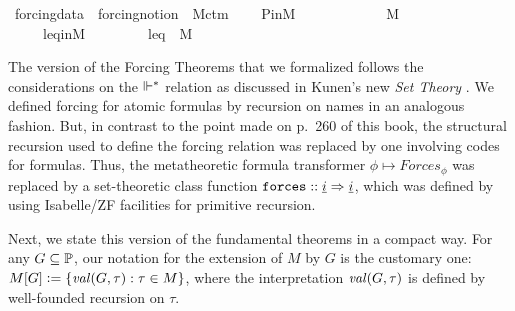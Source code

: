 \begin{isabelle}
\isamarkupfalse%
\ forcing{\isacharunderscore}{\kern0pt}data{}\ {\isacharequal}{\kern0pt}\ forcing{\isacharunderscore}{\kern0pt}notion\ {\isacharplus}{\kern0pt}\ M{\isacharunderscore}{\kern0pt}ctm{}\ {\isacharplus}{\kern0pt}\isanewline
\ \ \ P{\isacharunderscore}{\kern0pt}in{\isacharunderscore}{\kern0pt}M{\isacharcolon}{\kern0pt}\ \ \ \ \ \ \ \ \ \ \ {\isachardoublequoteopen}{\isasymbbbP}\ {\isasymin}\ M{\isachardoublequoteclose}\isanewline
\ \ \ \ \ leq{\isacharunderscore}{\kern0pt}in{\isacharunderscore}{\kern0pt}M{\isacharcolon}{\kern0pt}\ \ \ \ \ \ \ \ \ {\isachardoublequoteopen}leq\ {\isasymin}\ M{\isachardoublequoteclose}
\end{isabelle}
The version of the Forcing Theorems that we formalized follows the
considerations on the $\Vdash^*$ relation as discussed in Kunen's new
\emph{Set Theory}
\cite[p.~257ff]{kunen2011set}.
We defined forcing for atomic formulas by recursion on names in an
analogous fashion. But, in contrast to the point made on
p.~260 of this book, the structural recursion used to define the forcing
relation was replaced by one  involving codes for formulas. Thus, the metatheoretic formula
transformer $\phi\mapsto\mathit{Forces}_\phi$ was replaced by a
set-theoretic class function $\forceisa:: \tyi \fun \tyi$, which was defined by using
Isabelle/ZF facilities for primitive recursion.

Next, we state this version of the fundamental theorems in a compact
way. For any $G\subseteq \mathbb{P}$, our notation for the extension of $M$ by
$G$ is the  customary one: $M[G]\mathrel{\mathop:}=
\{ \operatorname{\mathit{val}}(G,\tau) : \tau\in M \}$, where the interpretation
$\operatorname{\mathit{val}}(G,\tau)$ is defined by well-founded recursion on
$\tau$.

